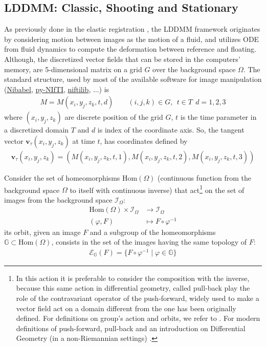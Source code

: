 \subsection{LDDMM: Classic, Shooting and Stationary}

As previously done in the elastic registration \cite{Broit:1981}, the LDDMM framework \cite{beg2005computing} originates by considering motion between images as the motion of a fluid, and utilizes ODE from fluid dynamics to compute the deformation between reference and floating. 
Although, the discretized vector fields that can be stored in the computers' memory, are 5-dimensional matrix on a grid $G$ over the background space $\Omega$. The standard structure, used by most of the available software for image manipulation (\href{http://nipy.org/nibabel/}{Nibabel}, \href{http://niftilib.sourceforge.net/pynifti/intro.html}{py-NIfTI}, \href{http://niftilib.sourceforge.net/}{niftilib}, ...) is 
\begin{align}\label{eq:basic_data_structure}
M = M(x_i,y_j,z_k,t,d) \qquad (i,j,k)\in G , ~~ t \in T  ~~ d = 1,2,3
\end{align}
where $(x_i,y_j,z_k)$ are discrete position of the grid $G$, $t$ is the time parameter in a discretized domain $T$ and $d$ is index of the coordinate axis. So, the tangent vector $\mathbf{v}_{\tau}(x_i,y_j,z_k)$ at time $t$, has coordinates defined by
\begin{align*}
\mathbf{v}_{\tau}(x_i,y_j,z_k) = (M(x_i,y_j,z_k,t ,1), M(x_i,y_j,z_k,t,2), M(x_i,y_j,z_k,t ,3))
\end{align*}

Consider the set of homeomorphisms $\text{Hom}(\Omega)$ (continuous function from the background space $\Omega$ to itself with continuous inverse) that act\footnote{In this action it is preferable to consider the composition with the inverse, because this same action in differential geometry, called pull-back play the role of the contravariant operator of the push-forward, widely used to make a vector field act on a domain different from the one has been originally defined. For definitions on group's action and orbits, we refer to \cite{artin2011algebra}. For modern definitions of push-forward, pull-back and an introduction on Differential Geometry (in a non-Riemannian settings) \cite{lee2012introduction}.} on the set of images from the background space $\mathcal{I}_{\Omega}$:
\begin{align*}
\text{Hom}(\Omega) \times \mathcal{I}_{\Omega} & \longrightarrow  \mathcal{I}_{\Omega}   \\
(\varphi,F) &\longmapsto F\circ \varphi^{-1}
\end{align*}
its orbit, given an image $F$ and a subgroup of the homeomorphisms $\mathbb{G}\subset \text{Hom}(\Omega)$, consists in the set of the images having the same topology of $F$: 
\begin{align*}
\mathcal{E}_{\mathbb{G}}(F) = \{ F\circ \varphi^{-1} \mid \varphi \in \mathbb{G} \}
\end{align*}

